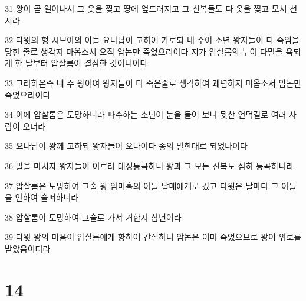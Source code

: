 \par 31 왕이 곧 일어나서 그 옷을 찢고 땅에 엎드러지고 그 신복들도 다 옷을 찢고 모셔 선지라
\par 32 다윗의 형 시므아의 아들 요나답이 고하여 가로되 내 주여 소년 왕자들이 다 죽임을 당한 줄로 생각지 마옵소서 오직 암논만 죽었으리이다 저가 압살롬의 누이 다말을 욕되게 한 날부터 압살롬이 결심한 것이니이다
\par 33 그러하온즉 내 주 왕이여 왕자들이 다 죽은줄로 생각하여 괘념하지 마옵소서 암논만 죽었으리이다
\par 34 이에 압살롬은 도망하니라 파수하는 소년이 눈을 들어 보니 뒷산 언덕길로 여러 사람이 오더라
\par 35 요나답이 왕께 고하되 왕자들이 오나이다 종의 말한대로 되었나이다
\par 36 말을 마치자 왕자들이 이르러 대성통곡하니 왕과 그 모든 신복도 심히 통곡하니라
\par 37 압살롬은 도망하여 그술 왕 암미훌의 아들 달매에게로 갔고 다윗은 날마다 그 아들을 인하여 슬퍼하니라
\par 38 압살롬이 도망하여 그술로 가서 거한지 삼년이라
\par 39 다윗 왕의 마음이 압살롬에게 향하여 간절하니 암논은 이미 죽었으므로 왕이 위로를 받았음이더라

\chapter{14}

